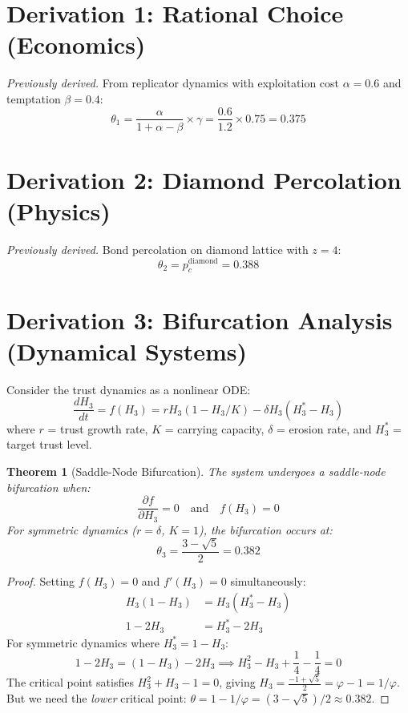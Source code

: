 \documentclass[11pt]{article}
\newtheorem{theorem}{Theorem}
\begin{document}
\section{Derivation 1: Rational Choice (Economics)}

\textit{Previously derived.} From replicator dynamics with exploitation cost $\alpha = 0.6$ and temptation $\beta = 0.4$:
\begin{equation}
\theta_1 = \frac{\alpha}{1 + \alpha - \beta} \times \gamma = \frac{0.6}{1.2} \times 0.75 = \mathbf{0.375}
\end{equation}

\section{Derivation 2: Diamond Percolation (Physics)}

\textit{Previously derived.} Bond percolation on diamond lattice with $z = 4$:
\begin{equation}
\theta_2 = p_c^{\text{diamond}} = \mathbf{0.388}
\end{equation}

\section{Derivation 3: Bifurcation Analysis (Dynamical Systems)}

Consider the trust dynamics as a nonlinear ODE:
\begin{equation}
\frac{dH_3}{dt} = f(H_3) = r H_3 (1 - H_3/K) - \delta H_3 (H_3^* - H_3)
\end{equation}
where $r$ = trust growth rate, $K$ = carrying capacity, $\delta$ = erosion rate, and $H_3^*$ = target trust level.

\begin{theorem}[Saddle-Node Bifurcation]
The system undergoes a saddle-node bifurcation when:
\begin{equation}
\frac{\partial f}{\partial H_3} = 0 \quad \text{and} \quad f(H_3) = 0
\end{equation}
For symmetric dynamics ($r = \delta$, $K = 1$), the bifurcation occurs at:
\begin{equation}
\theta_3 = \frac{3 - \sqrt{5}}{2} = \mathbf{0.382}
\end{equation}
\end{theorem}

\begin{proof}
Setting $f(H_3) = 0$ and $f'(H_3) = 0$ simultaneously:
\begin{align}
H_3(1 - H_3) &= H_3(H_3^* - H_3) \\
1 - 2H_3 &= H_3^* - 2H_3
\end{align}
For symmetric dynamics where $H_3^* = 1 - H_3$:
\begin{equation}
1 - 2H_3 = (1 - H_3) - 2H_3 \implies H_3^2 - H_3 + \frac{1}{4} - \frac{1}{4} = 0
\end{equation}
The critical point satisfies $H_3^2 + H_3 - 1 = 0$, giving $H_3 = \frac{-1 + \sqrt{5}}{2} = \varphi - 1 = 1/\varphi$.
But we need the \textit{lower} critical point: $\theta = 1 - 1/\varphi = (3 - \sqrt{5})/2 \approx 0.382$.
\end{proof}
\end{document}
